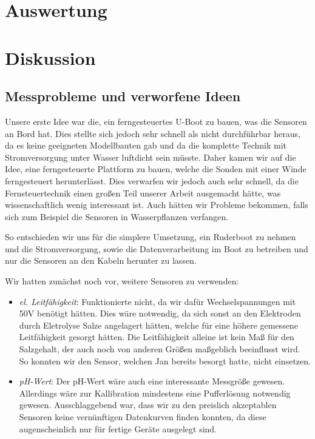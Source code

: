 \documentclass[12pt,a4paper,titlepage,headinclude,bibtotoc]{scrartcl}
\begin{document}
\section{Auswertung}
\label{sec:auswertung}

\section{Diskussion}
\label{sec:diskussion}
\subsection{Messprobleme und verworfene Ideen}
Unsere erste Idee war die, ein ferngesteuertes U-Boot zu bauen, was die Sensoren an Bord hat.
Dies stellte sich jedoch sehr schnell als nicht durchführbar heraus, da es keine geeigneten Modellbauten gab und da die komplette Technik mit Stromversorgung unter Wasser luftdicht sein müsste.
Daher kamen wir auf die Idee, eine ferngesteuerte Plattform zu bauen, welche die Sonden mit einer Winde ferngesteuert herunterlässt.
Dies verwarfen wir jedoch auch sehr schnell, da die Fernsteuertechnik einen großen Teil unserer Arbeit ausgemacht hätte, was wissenschaftlich wenig interessant ist.
Auch hätten wir Probleme bekommen, falls sich zum Beispiel die Sensoren in Wasserpflanzen verfangen.

So entschieden wir uns für die simplere Umsetzung, ein Ruderboot zu nehmen und die Stromversorgung, sowie die Datenverarbeitung im Boot zu betreiben und nur die Sensoren an den Kabeln herunter zu lassen.


Wir hatten zunächst noch vor, weitere Sensoren zu verwenden:
\begin{itemize}
	\item \textit{el. Leitfähigkeit}: Funktionierte nicht, da wir dafür Wechselspannungen mit 50V benötigt hätten.
		Dies wäre notwendig, da sich sonst an den Elektroden durch Eletrolyse Salze angelagert hätten, welche für eine höhere gemessene Leitfähigkeit gesorgt hätten.
		Die Leitfähigkeit alleine ist kein Maß für den Salzgehalt, der auch noch von anderen Größen maßgeblich beeinflusst wird.
		So konnten wir den Sensor, welchen Jan bereits besorgt hatte, nicht einsetzen.
	\item \textit{pH-Wert}: Der pH-Wert wäre auch eine interessante Messgröße gewesen.
		Allerdings wäre zur Kallibration mindestens eine Pufferlösung notwendig gewesen.
		Ausschlaggebend war, dass wir zu den preislich akzeptablen Sensoren keine vernünftigen Datenkurven finden konnten, da diese augenscheinlich nur für fertige Geräte ausgelegt sind.
\end{itemize}




\end{document}
